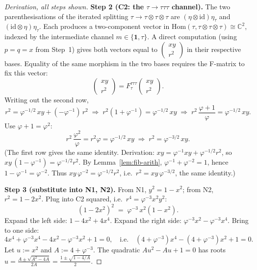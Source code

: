 \documentclass[11pt,a4paper]{article}
\theoremstyle{definition}
\newcommand{\Hom}{\mathrm{Hom}}
\newcommand{\id}{\mathrm{id}}
\newcommand{\one}{\mathbf{1}}
\begin{document}
\begin{proof}[Derivation, all steps shown]
\textbf{Step 2 (C2: the $\tau\to\tau\tau\tau$ channel).}
The two parenthesisations of the iterated splitting $\tau\to\tau\otimes\tau\otimes\tau$ are
$(\eta\otimes\id)\eta_\tau$ and $(\id\otimes\eta)\eta_\tau$. Each produces a
two-component vector in $\Hom(\tau,\tau\otimes\tau\otimes\tau)\cong\mathbb{C}^{2}$, indexed
by the intermediate channel $m\in\{\one,\tau\}$. A direct computation (using
$p=q=x$ from Step~1) gives both vectors equal to
$\begin{pmatrix} x y \\ r^{2}\end{pmatrix}$ in their respective bases.
Equality of the same morphism in the two bases requires the F-matrix to fix
this vector:
\[
\begin{pmatrix} xy\\ r^{2}\end{pmatrix}
= F^{\tau\tau\tau}_\tau \begin{pmatrix} xy\\ r^{2}\end{pmatrix}.
\]
Writing out the second row,
\[
r^{2} = \varphi^{-1/2}\,xy + (-\varphi^{-1})\,r^{2}
\;\Longrightarrow\;
r^{2}(1+\varphi^{-1}) = \varphi^{-1/2}\,xy
\;\Longrightarrow\;
r^{2}\,\frac{\varphi+1}{\varphi} = \varphi^{-1/2}\,xy.
\]
Use $\varphi+1=\varphi^{2}$:
\[
r^{2}\,\frac{\varphi^{2}}{\varphi} = r^{2}\varphi = \varphi^{-1/2}\,xy
\;\Longrightarrow\;
r^{2} = \varphi^{-3/2}\,xy.
\]
(The first row gives the same identity. Derivation:
$xy = \varphi^{-1}xy + \varphi^{-1/2}r^{2}$, so
$xy\,(1-\varphi^{-1}) = \varphi^{-1/2}r^{2}$. By
Lemma~\ref{lem:fib-arith}, $\varphi^{-1}+\varphi^{-2}=1$, hence
$1-\varphi^{-1}=\varphi^{-2}$. Thus
$xy\,\varphi^{-2} = \varphi^{-1/2}r^{2}$, i.e.\
$r^{2} = xy\,\varphi^{-3/2}$, the same identity.)

\textbf{Step 3 (substitute into N1, N2).} From N1, $y^{2}=1-x^{2}$; from N2,
$r^{2}=1-2x^{2}$. Plug into C2 squared, i.e.\ $r^{4}=\varphi^{-3}x^{2}y^{2}$:
\[
(1-2x^{2})^{2} \;=\; \varphi^{-3}\,x^{2}(1-x^{2}).
\]
Expand the left side: $1 - 4x^{2} + 4x^{4}$.
Expand the right side: $\varphi^{-3}x^{2} - \varphi^{-3}x^{4}$.
Bring to one side:
\[
4x^{4} + \varphi^{-3}x^{4} - 4x^{2} - \varphi^{-3}x^{2} + 1 = 0,
\quad\text{i.e.}\quad
(4+\varphi^{-3})x^{4} - (4+\varphi^{-3})x^{2} + 1 = 0.
\]
Let $u := x^{2}$ and $A := 4+\varphi^{-3}$. The quadratic $Au^{2}-Au+1=0$ has
roots $u = \frac{A\pm\sqrt{A^{2}-4A}}{2A} = \frac{1\pm\sqrt{1-4/A}}{2}$.


\end{proof}
\end{document}
